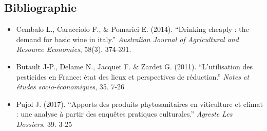 \documentclass[11pt,]{article}
\providecommand{\tightlist}{%
  \setlength{\itemsep}{0pt}\setlength{\parskip}{0pt}}
\begin{document}
\FloatBarrier

\hypertarget{bibliographie}{%
\subsection{Bibliographie}\label{bibliographie}}

\begin{itemize}
\tightlist
\item
  Cembalo L., Caracciolo F., \& Pomarici E. (2014). ``Drinking cheaply :
  the demand for basic wine in italy.'' \emph{Australian Journal of
  Agricultural and Resource Economics}, 58(3). 374-391.
\item
  Butault J-P., Delame N., Jacquet F. \& Zardet G. (2011).
  ``L'utilisation des pesticides en France: état des lieux et
  perspectives de réduction.'' \emph{Notes et études socio-économiques},
  35. 7-26
\item
  Pujol J. (2017). ``Apports des produits phytosanitaires en viticulture
  et climat : une analyse à partir des enquêtes pratiques culturales.''
  \emph{Agreste Les Dossiers}. 39. 3-25
\end{itemize}
\end{document}
